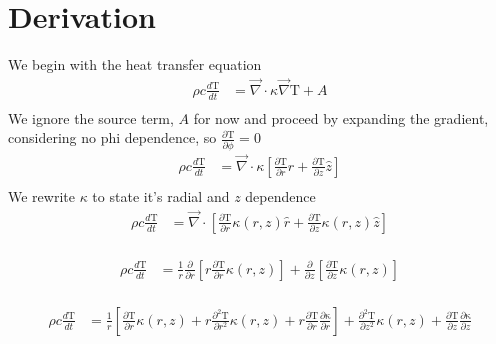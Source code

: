 \documentclass[12pt]{article}
\begin{document}
		\section{Derivation}
		We begin with the heat transfer equation
		\begin{equation}
		\begin{aligned}
		\rho c \frac{d\mathrm{T}}{dt} &= \vec\nabla \cdot \kappa \vec\nabla \mathrm{T} + A \\
		\end{aligned}
		\end{equation}
		We ignore the source term, $A$ for now and proceed by expanding the gradient, considering no phi dependence, so $\frac{\partial\mathrm{T}}{\partial\phi}=0$
		\begin{equation}
		\begin{aligned}
		\rho c \frac{d\mathrm{T}}{dt} &= \vec\nabla \cdot \kappa \left [  \frac{\partial\mathrm{T}}{\partial r}\hat r  + \frac{\partial\mathrm{T}}{\partial z}\hat z \right ] \\
		\end{aligned}
		\end{equation}
		We rewrite $\kappa$ to state it's radial and $z$ dependence
		\begin{equation}
		\begin{aligned}
		\rho c \frac{d\mathrm{T}}{dt} &= \vec\nabla \cdot \left [  \frac{\partial\mathrm{T}}{\partial r}\kappa(r, z) \hat r  + \frac{\partial\mathrm{T}}{\partial z}\kappa(r, z) \hat z \right ] \\
		\end{aligned}
		\end{equation}
		
		\begin{equation}
		\begin{aligned}
		\rho c \frac{d\mathrm{T}}{dt} &= \frac{1}{r}\frac{\partial}{\partial r}  \left [ r \frac{\partial\mathrm{T}}{\partial r}\kappa(r, z) \right ]  + \frac{\partial}{\partial z} \left [ \frac{\partial\mathrm{T}}{\partial z}\kappa(r, z)  \right ] \\
		\end{aligned}
		\end{equation}
		
		\begin{equation}
		\begin{aligned}
		\rho c \frac{d\mathrm{T}}{dt} &= \frac{1}{r} \left [ \frac{\partial\mathrm{T}}{\partial r}\kappa(r, z) + r\frac{\partial^2\mathrm{T}}{\partial r^2}\kappa(r, z)  + r\frac{\partial\mathrm{T}}{\partial r} \frac{\partial\mathrm{\kappa}}{\partial r} \right ] + \frac{\partial^2\mathrm{T}}{\partial z^2}\kappa(r, z) + \frac{\partial\mathrm{T}}{\partial z}\frac{\partial\mathrm{\kappa}}{\partial z} \\
		\end{aligned}
		\end{equation}
		
\end{document}
